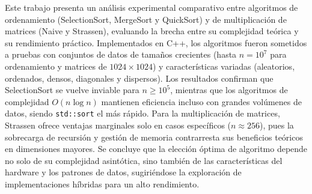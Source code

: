 Este trabajo presenta un análisis experimental comparativo entre algoritmos de ordenamiento (SelectionSort, MergeSort y QuickSort) y de multiplicación de matrices (Naive y Strassen), evaluando la brecha entre su complejidad teórica y su rendimiento práctico. Implementados en C++, los algoritmos fueron sometidos a pruebas con conjuntos de datos de tamaños crecientes (hasta \(n = 10^7\) para ordenamiento y matrices de \(1024 \times 1024\)) y características variadas (aleatorios, ordenados, densos, diagonales y dispersos). Los resultados confirman que SelectionSort se vuelve inviable para \(n \geq 10^5\), mientras que los algoritmos de complejidad \(O(n \log n)\) mantienen eficiencia incluso con grandes volúmenes de datos, siendo \texttt{std::sort} el más rápido. Para la multiplicación de matrices, Strassen ofrece ventajas marginales solo en casos específicos (\(n \approx 256\)), pues la sobrecarga de recursión y gestión de memoria contrarresta sus beneficios teóricos en dimensiones mayores. Se concluye que la elección óptima de algoritmo depende no solo de su complejidad asintótica, sino también de las características del hardware y los patrones de datos, sugiriéndose la exploración de implementaciones híbridas para un alto rendimiento.